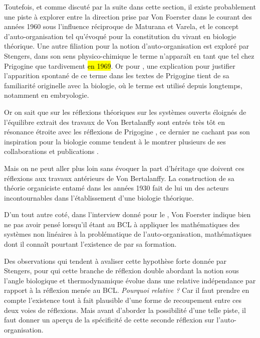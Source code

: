Toutefois, et comme discuté par la suite dans cette section, il existe probablement une piste à explorer entre la direction prise par Von Foerster dans le courant des années 1960 sous l'influence réciproque de Maturana et Varela, et le concept d'auto-organisation tel qu'évoqué pour la constitution du vivant en biologie théorique. Une autre filiation pour la notion d'auto-organisation est exploré par Stengers, dans son sens physico-chimique le terme n’apparaît en tant que tel chez Prigogine que tardivement \hl{en 1969}. Or pour \textcite[64]{Stengers1985}, une explication pour justifier l'apparition spontané de ce terme dans les textes de Prigogine tient de sa familiarité originelle avec la biologie, où le terme est utilisé depuis longtemps, notamment en embryologie.

Or on sait que sur les réflexions théoriques sur les systèmes ouverts éloignés de l'équilibre extrait des travaux de Von Bertalanffy sont entrés très tôt en résonance étroite \autocite[653-661]{Pouvreau2013} avec les réflexions de Prigogine \autocite{Prigogine1996}, ce dernier ne cachant pas son inspiration pour la biologie comme tendent à le montrer plusieurs de ses collaborations et publications \autocites[59-67]{Stengers1985}{Prigogine1946}. 

Mais on ne peut aller plus loin sans évoquer la part d'héritage que doivent ces réflexions aux travaux antérieurs de Von Bertalanffy. La construction de sa théorie organiciste  entamé dans les années 1930 fait de lui un des acteurs incontournables dans l'établissement d'une biologie théorique.

D'un tout autre coté, dans l'interview donné pour le \textcite[255]{CREA1985}, Von Foerster indique bien ne pas avoir pensé lorsqu'il étant au BCL à appliquer les mathématiques des systèmes non linéaires à la problématique de l'auto-organisation, mathématiques dont il connaît pourtant l'existence de par sa formation. 


Des observations qui tendent à avaliser cette hypothèse forte donnée par Stengers, pour qui cette branche de réflexion double abordant la notion sous l'angle biologique et thermodynamique évolue dans une relative indépendance par rapport à la réflexion menée au BCL. \textit{Pourquoi relative ?} Car il faut prendre en compte l'existence tout à fait plausible d'une forme de recoupement entre ces deux voies de réflexions. Mais avant d'aborder la possibilité d'une telle piste, il faut donner un aperçu de la spécificité de cette seconde réflexion sur l'auto-organisation.

